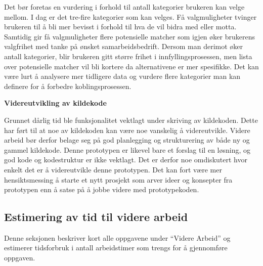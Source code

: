 Det bør foretas en vurdering i forhold til antall kategorier brukeren kan velge mellom. I dag er det tre-fire kategorier som kan velges. Få valgmuligheter tvinger brukeren til å bli mer bevisst i forhold til hva de vil bidra med eller motta. Samtidig gir få valgmuligheter flere potensielle matcher som igjen øker brukerens valgfrihet med tanke på ønsket samarbeidsbedrift. Dersom man derimot øker antall kategorier, blir brukeren gitt større frihet i innfyllingsprosessen, men lista over potensielle matcher vil bli kortere da alternativene er mer spesifikke. Det kan være lurt å analysere mer tidligere data og vurdere flere kategorier man kan definere for å forbedre koblingsprosessen.

{\bf Videreutvikling av kildekode}

Grunnet dårlig tid ble funksjonalitet vektlagt under skriving av kildekoden. Dette har ført til at noe av kildekoden kan være noe vanskelig å videreutvikle. Videre arbeid bør derfor belage seg på god planlegging og strukturering av både ny og gammel kildekode. Denne prototypen er likevel bare et forslag til en løsning, og god kode og kodestruktur er ikke vektlagt. Det er derfor noe omdiskutert hvor enkelt det er å videreutvikle denne prototypen. Det kan fort være mer hensiktsmessing å starte et nytt prosjekt som arver ideer og konsepter fra prototypen enn å satse på å jobbe videre med prototypekoden.

\subsection{Estimering av tid til videre arbeid}

Denne seksjonen beskriver kort alle oppgavene under ``Videre Arbeid” og estimerer tidsforbruk i antall arbeidstimer som trengs for å gjennomføre oppgaven.

